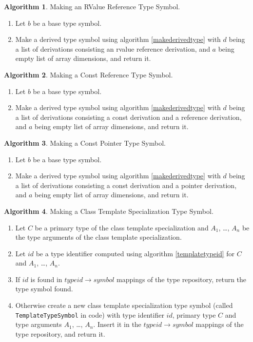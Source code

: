 \documentclass[a4paper,oneside,11pt]{book}
\theoremstyle{definition}
\newtheorem{algo}{Algorithm}[section]
\begin{document}
\begin{algo}\label{makervaluereftype} Making an RValue Reference Type Symbol.
\begin{enumerate}
\item
Let $b$ be a base type symbol.
\item
Make a derived type symbol using algorithm \ref{makederivedtype} with $d$ being a list of derivations consisting an rvalue reference derivation,
and $a$ being empty list of array dimensions, and return it.
\end{enumerate}
\end{algo}

\begin{algo}\label{makeconstreftype} Making a Const Reference Type Symbol.
\begin{enumerate}
\item
Let $b$ be a base type symbol.
\item
Make a derived type symbol using algorithm \ref{makederivedtype} with $d$ being a list of derivations consisting a const derivation and a reference derivation,
and $a$ being empty list of array dimensions, and return it.
\end{enumerate}
\end{algo}

\begin{algo}\label{makeconstpointertype} Making a Const Pointer Type Symbol.
\begin{enumerate}
\item
Let $b$ be a base type symbol.
\item
Make a derived type symbol using algorithm \ref{makederivedtype} with $d$ being a list of derivations consisting a const derivation and a pointer derivation,
and $a$ being empty list of array dimensions, and return it.
\end{enumerate}
\end{algo}

\begin{algo}\label{maketemplatetype} Making a Class Template Specialization Type Symbol.
\begin{enumerate}
\item
Let $C$ be a primary type of the class template specialization and $A_1$, \ldots, $A_n$ be the type arguments of the class template specialization.
\item
Let $id$ be a type identifier computed using algorithm \ref{templatetypeid} for $C$ and $A_1$, \ldots, $A_n$.
\item
If $id$ is found in $type id \rightarrow symbol$ mappings of the type repository, return the type symbol found.
\item
Otherwise create a new class template specialization type symbol (called \verb|TemplateTypeSymbol| in code)
with type identifier $id$, primary type $C$ and type arguments $A_1$, \ldots, $A_n$.
Insert it in the $type id \rightarrow symbol$ mappings of the type repository, and return it.
\end{enumerate}
\end{algo}
\end{document}

